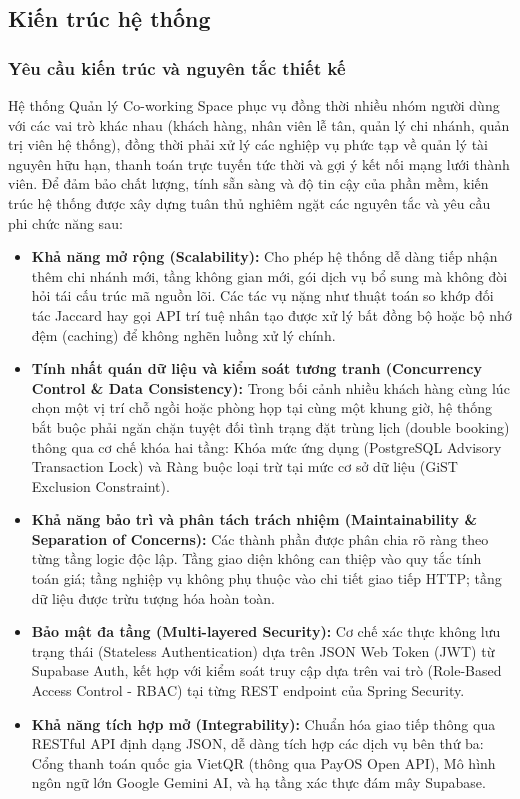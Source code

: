 \subsection{Kiến trúc hệ thống}

\subsubsection{Yêu cầu kiến trúc và nguyên tắc thiết kế}

Hệ thống Quản lý Co-working Space phục vụ đồng thời nhiều nhóm người dùng với các vai trò khác nhau (khách hàng, nhân viên lễ tân, quản lý chi nhánh, quản trị viên hệ thống), đồng thời phải xử lý các nghiệp vụ phức tạp về quản lý tài nguyên hữu hạn, thanh toán trực tuyến tức thời và gợi ý kết nối mạng lưới thành viên. Để đảm bảo chất lượng, tính sẵn sàng và độ tin cậy của phần mềm, kiến trúc hệ thống được xây dựng tuân thủ nghiêm ngặt các nguyên tắc và yêu cầu phi chức năng sau:

\begin{itemize}
    \item \textbf{Khả năng mở rộng (Scalability):} Cho phép hệ thống dễ dàng tiếp nhận thêm chi nhánh mới, tầng không gian mới, gói dịch vụ bổ sung mà không đòi hỏi tái cấu trúc mã nguồn lõi. Các tác vụ nặng như thuật toán so khớp đối tác Jaccard hay gọi API trí tuệ nhân tạo được xử lý bất đồng bộ hoặc bộ nhớ đệm (caching) để không nghẽn luồng xử lý chính.
    \item \textbf{Tính nhất quán dữ liệu và kiểm soát tương tranh (Concurrency Control \& Data Consistency):} Trong bối cảnh nhiều khách hàng cùng lúc chọn một vị trí chỗ ngồi hoặc phòng họp tại cùng một khung giờ, hệ thống bắt buộc phải ngăn chặn tuyệt đối tình trạng đặt trùng lịch (double booking) thông qua cơ chế khóa hai tầng: Khóa mức ứng dụng (PostgreSQL Advisory Transaction Lock) và Ràng buộc loại trừ tại mức cơ sở dữ liệu (GiST Exclusion Constraint).
    \item \textbf{Khả năng bảo trì và phân tách trách nhiệm (Maintainability \& Separation of Concerns):} Các thành phần được phân chia rõ ràng theo từng tầng logic độc lập. Tầng giao diện không can thiệp vào quy tắc tính toán giá; tầng nghiệp vụ không phụ thuộc vào chi tiết giao tiếp HTTP; tầng dữ liệu được trừu tượng hóa hoàn toàn.
    \item \textbf{Bảo mật đa tầng (Multi-layered Security):} Cơ chế xác thực không lưu trạng thái (Stateless Authentication) dựa trên JSON Web Token (JWT) từ Supabase Auth, kết hợp với kiểm soát truy cập dựa trên vai trò (Role-Based Access Control - RBAC) tại từng REST endpoint của Spring Security.
    \item \textbf{Khả năng tích hợp mở (Integrability):} Chuẩn hóa giao tiếp thông qua RESTful API định dạng JSON, dễ dàng tích hợp các dịch vụ bên thứ ba: Cổng thanh toán quốc gia VietQR (thông qua PayOS Open API), Mô hình ngôn ngữ lớn Google Gemini AI, và hạ tầng xác thực đám mây Supabase.
\end{itemize}

